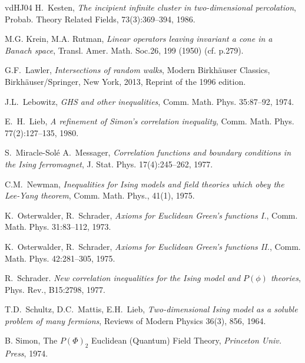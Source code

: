 \documentclass[a4paper,oneside,11pt]{article}
\numberwithin{equation}{section}
\numberwithin{equation}{section}
\numberwithin{equation}{section}
\begin{document}
\begin{thebibliography}{vdHJ04}
H.~Kesten, \emph{The incipient infinite cluster in two-dimensional
  percolation}, Probab. Theory Related Fields,  73(3):369--394, 1986. 

 M.G. Krein, M.A. Rutman, \emph{Linear operators leaving 
invariant a cone in a Banach space},  Transl. Amer. Math. Soc.26, 199 (1950) (cf. p.279).

G.F.~Lawler, \emph{Intersections of random walks}, Modern Birkh{\"a}user
  Classics, Birkh{\"a}user/Springer, New York, 2013, Reprint of the 1996
  edition. 

 J.L.~Lebowitz, \emph{GHS and other inequalities},   
  Comm. Math. Phys.  35:87--92, 1974.

E.~H.~Lieb, \emph{A refinement of {S}imon's correlation inequality},   Comm.
  Math. Phys. 77(2):127--135, 1980. 

  
S.~Miracle-Sol\'e A.~Messager, \emph{Correlation functions and boundary conditions
  in the Ising ferromagnet},  J. Stat. Phys. 17(4):245--262, 1977.
  
 C.M.~Newman, \emph{Inequalities for Ising models and field theories 
which obey the Lee-Yang theorem},   Comm. Math. Phys., 41(1), 1975.  


K.~Osterwalder, R.~Schrader, \emph{Axioms for Euclidean Green's functions I.},   Comm. Math. Phys. 31:83--112, 1973.

K.~Osterwalder, R.~Schrader, \emph{ Axioms for Euclidean Green's functions II.},   Comm. Math. Phys. 42:281--305, 1975. 

R.~Schrader.  \emph{ New correlation inequalities for the Ising model and $P(\phi)$ theories},
 Phys. Rev., B15:2798, 1977.

T.D.~Schultz, D.C.~Mattis, E.H.~Lieb,
\emph{ Two-dimensional Ising model as a soluble problem of many fermions},
Reviews of Modern Physics 36(3), 856, 1964.

 B. Simon,  The $P(\Phi)_2$ Euclidean (Quantum) Field Theory, {\em Princeton Univ. Press}, 1974.


\end{thebibliography}
\end{document}
